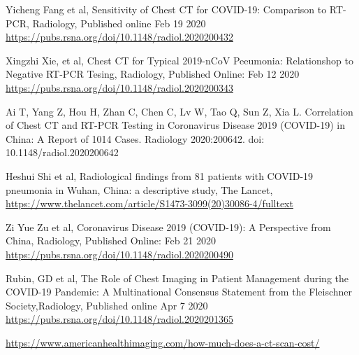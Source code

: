 \documentclass[onecolumn,journal]{IEEEtran}
\begin{document}
\begin{thebibliography}{20}

 Yicheng Fang et al, Sensitivity of Chest CT for COVID-19: Comparison to RT-PCR, Radiology, Published online Feb 19 2020 \url{https://pubs.rsna.org/doi/10.1148/radiol.2020200432}

 Xingzhi Xie, et al, Chest CT for Typical 2019-nCoV Peeumonia: Relationshop to Negative RT-PCR Tesing, Radiology, Published Online: Feb 12 2020 \url{https://pubs.rsna.org/doi/10.1148/radiol.2020200343}

 Ai T, Yang Z, Hou H, Zhan C, Chen C, Lv W, Tao Q, Sun Z, Xia L. Correlation of Chest CT and RT-PCR Testing in Coronavirus Disease 2019 (COVID-19) in China: A Report of 1014 Cases. Radiology 2020:200642. doi: 10.1148/radiol.2020200642

 Heshui Shi et al, Radiological findings from 81 patients with COVID-19 pneumonia in Wuhan, China: a descriptive study, The Lancet, \url{https://www.thelancet.com/article/S1473-3099(20)30086-4/fulltext}

 Zi Yue Zu et al, Coronavirus Disease 2019 (COVID-19): A Perspective from China, Radiology, Published Online: Feb 21 2020 \url{https://pubs.rsna.org/doi/10.1148/radiol.2020200490}

 Rubin, GD et al, The Role of Chest Imaging in Patient Management during the COVID-19 Pandemic: A Multinational Consensus Statement from the Fleischner Society,Radiology, Published online Apr 7 2020 \url{https://pubs.rsna.org/doi/10.1148/radiol.2020201365}

 \url{https://www.americanhealthimaging.com/how-much-does-a-ct-scan-cost/}
\end{thebibliography}

% 
\end{document}
